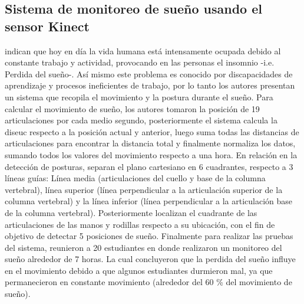 \subsection{Sistema de monitoreo de sue\~no usando el sensor Kinect} \label{tr:5}
 indican que hoy en d\'ia la vida humana est\'a intensamente ocupada debido al constante trabajo y actividad, provocando en las personas el insomnio -i.e. Perdida del sue\~no-. As\'i mismo este problema es conocido por discapacidades de aprendizaje y procesos ineficientes de trabajo, por lo tanto los autores presentan un sistema que recopila el movimiento y la postura durante el sue\~no.
\medbreak
Para calcular el movimiento de sue\~no, los autores tomaron la posici\'on de 19 articulaciones por cada medio segundo, posteriormente el sistema calcula la \gls{diseuc} respecto a la posici\'on actual y anterior, luego suma todas las distancias de articulaciones para encontrar la distancia total y finalmente normaliza los datos, sumando todos los valores del movimiento respecto a una hora.
\medbreak
En relaci\'on en la detecci\'on de posturas,  separan el plano cartesiano en 6 cuadrantes, respecto a 3 l\'ineas gu\'ias: L\'inea media (articulaciones del cuello y base de la columna vertebral), l\'inea superior (l\'inea perpendicular a la articulaci\'on superior  de la columna vertebral) y la l\'inea inferior (l\'inea perpendicular a la articulaci\'on base  de la columna vertebral). Posteriormente localizan el cuadrante de las articulaciones de las manos y rodillas respecto a su ubicaci\'on, con el fin de objetivo de detectar 5 posiciones de sue\~no.
\medbreak
Finalmente para realizar las pruebas del sistema, reunieron a 20 estudiantes en donde realizaron un monitoreo del sue\~no alrededor de 7 horas. La cual concluyeron que la perdida del sue\~no influye en el movimiento debido a que algunos estudiantes durmieron mal, ya que permanecieron en constante movimiento (alrededor del 60 \% del  movimiento de sue\~no).
